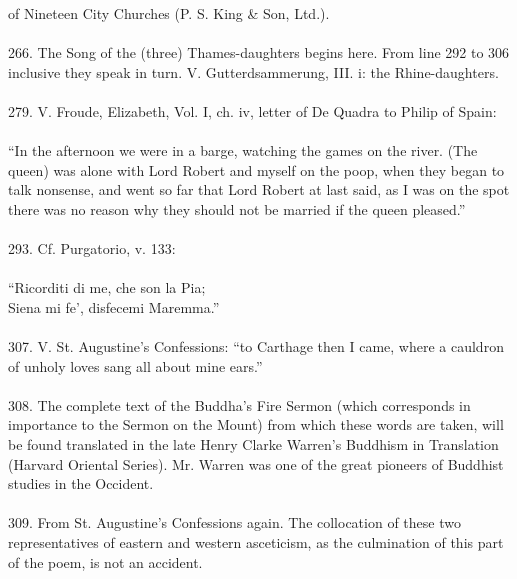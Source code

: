 \documentclass{article}
\begin{document}
of Nineteen City Churches (P. S. King \& Son, Ltd.). \\
 \\
266.  The Song of the (three) Thames-daughters begins here.
From line 292 to 306 inclusive they speak in turn.
V.  Gutterdsammerung, III.  i:  the Rhine-daughters. \\
 \\
279.  V. Froude, Elizabeth, Vol.  I, ch.  iv, letter of De Quadra
to Philip of Spain: \\
 \\
``In the afternoon we were in a barge, watching the games on the river.
(The queen) was alone with Lord Robert and myself on the poop,
when they began to talk nonsense, and went so far that Lord Robert
at last said, as I was on the spot there was no reason why they
should not be married if the queen pleased.'' \\
 \\
293.  Cf.  Purgatorio, v.  133: \\
 \\
\indent     ``Ricorditi di me, che son la Pia; \\
\indent     Siena mi fe', disfecemi Maremma.'' \\
 \\
307.  V. St. Augustine's Confessions:  ``to Carthage then I came,
where a cauldron of unholy loves sang all about mine ears.'' \\
 \\
308.  The complete text of the Buddha's Fire Sermon (which corresponds
in importance to the Sermon on the Mount) from which these words are taken,
will be found translated in the late Henry Clarke Warren's Buddhism
in Translation (Harvard Oriental Series). Mr. Warren was one
of the great pioneers of Buddhist studies in the Occident. \\
 \\
309.  From St. Augustine's Confessions again.  The collocation
of these two representatives of eastern and western asceticism,
as the culmination of this part of the poem, is not an accident. \\
 \\
\end{document}
